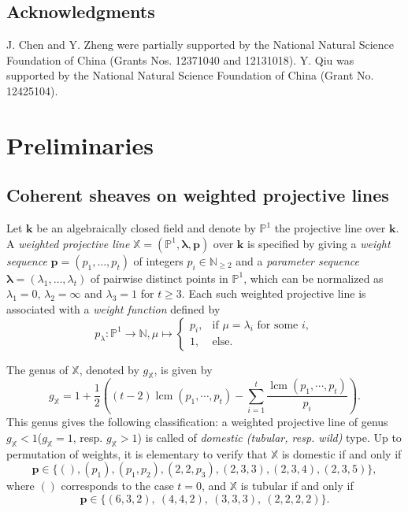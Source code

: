 \documentclass[11pt,a4paper,reqno]{amsart}%
\theoremstyle{plain}
\theoremstyle{definition}
\numberwithin{equation}{section}
\numberwithin{equation}{section}
\def\NN{\mathbb{N}}
\def\XX{\mathbb{X}}
\newcommand{\lcm}{\operatorname{lcm}}
\newcommand{\genus}[1]{g_{#1}}
\begin{document}
\subsection*{Acknowledgments} J. Chen and Y. Zheng were partially  supported by   the  National Natural Science Foundation of China (Grants Nos. 12371040 and 12131018). Y. Qiu was supported by the National Natural Science Foundation of China (Grant No. 12425104). 

\section{Preliminaries}\label{sec:2}
  
\subsection{Coherent sheaves on weighted projective lines} 
Let $\mathbf{k}$ be an algebraically closed field and denote by $\mathbb{P}^1$ the projective  
line over $\mathbf{k}$.  
A \emph{weighted projective line} $\XX=(\mathbb{P}^1,\boldsymbol{\lambda},\mathbf{p})$ over $\mathbf{k}$ is specified by giving a  \emph{weight sequence} $\mathbf{p}=(p_1,\ldots,p_t)$ of integers $p_i\in\NN_{\geq 2}$ and a \emph{parameter sequence }
$\boldsymbol{\lambda}=(\lambda_1,\ldots,\lambda_t)$ of pairwise distinct points in $\mathbb{P}^1$, which can be normalized as  
$\lambda_1=0$, $\lambda_2=\infty$ and $\lambda_3=1$ for $t\geq 3$.
Each such  weighted projective line is associated  with a  \emph{weight function}  defined by
\[
p_\lambda:\mathbb{P}^1\rightarrow\NN,\mu\mapsto\begin{cases}
p_i, &\text{if } \mu=\lambda_i \text{ for some } i,\\
1,   &\text{else.}\end{cases} 
\]

  The genus  of   $\XX$, denoted by $\genus{\XX}$,   is given by
$$\genus{\XX} =1+\frac{1}{2}\left((t-2)\lcm(p_{1}, \cdots, p_{t})-\sum_{i=1}^t \frac{\lcm(p_{1}, \cdots, p_{t})}{p_i}\right).$$ %
This genus gives the following classification: a weighted projective line of genus $\genus\XX< 1$($\genus\XX= 1$, resp. $\genus\XX> 1$) is called of \emph{domestic (tubular, resp. wild)} type. 
Up  to permutation of weights,  it is elementary to verify that $\XX$ is 
 domestic   if and only if
  \[
\mathbf{p}\in\{( ), (p_1), (p_1 , p_2) ,(2, 2, p_3) ,(2, 3, 3), (2, 3, 4),  (2, 3, 5)  \},
 \] where $()$ corresponds to the case   $t=0$, and  $\XX$ is tubular if and only if 
 \[
\mathbf{p}\in\{(6,3,2),\ (4,4,2),\ (3,3,3),\ (2,2,2,2)\}.
 \]   
\end{document}
